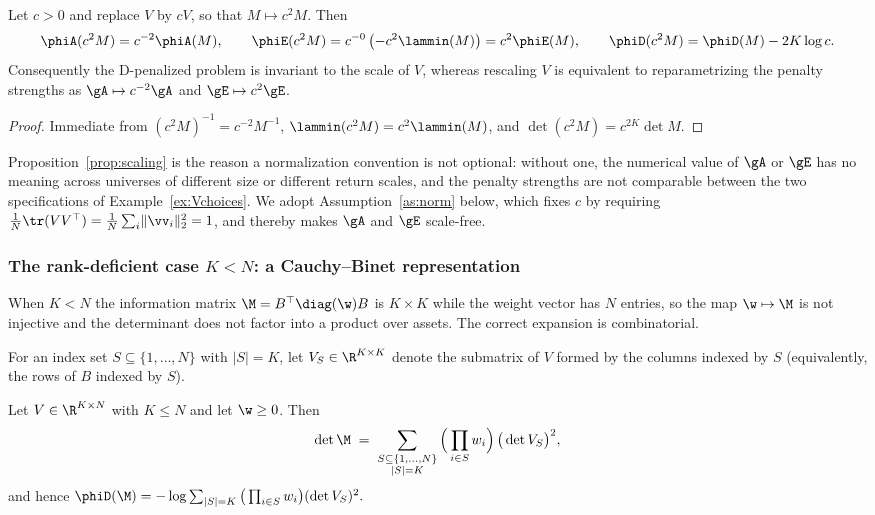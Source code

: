 \begin{proposition}[Scaling]
\label{prop:scaling}
Let $c>0$ and replace $V$ by $cV$, so that $M\mapsto c^{2}M$. Then
\[
  \phiA(c^{2}M)=c^{-2}\phiA(M),\qquad
  \phiE(c^{2}M)=c^{-0}\,\big({-}c^{2}\lammin(M)\big)=c^{2}\phiE(M),\qquad
  \phiD(c^{2}M)=\phiD(M)-2K\log c .
\]
Consequently the D-penalized problem is invariant to the scale of $V$, whereas
rescaling $V$ is equivalent to reparametrizing the penalty strengths as
$\gA\mapsto c^{-2}\gA$ and $\gE\mapsto c^{2}\gE$.
\end{proposition}

\begin{proof}
Immediate from $(c^2M)^{-1}=c^{-2}M^{-1}$, $\lammin(c^2M)=c^2\lammin(M)$, and
$\det(c^2M)=c^{2K}\det M$.
\end{proof}

Proposition~\ref{prop:scaling} is the reason a normalization convention is not
optional: without one, the numerical value of $\gA$ or $\gE$ has no meaning
across universes of different size or different return scales, and the penalty
strengths are not comparable between the two specifications of
Example~\ref{ex:Vchoices}. We adopt Assumption~\ref{as:norm} below, which fixes
$c$ by requiring $\tfrac1N\tr(VV^\top)=\tfrac1N\sum_i\lVert\vv_i\rVert_2^2=1$, and
thereby makes $\gA$ and $\gE$ scale-free.

\subsubsection{The rank-deficient case $K<N$: a Cauchy--Binet representation}

When $K<N$ the information matrix $\M=B^\top\diag(\w)B$ is $K\times K$ while the
weight vector has $N$ entries, so the map $\w\mapsto\M$ is not injective and the
determinant does not factor into a product over assets. The correct expansion is
combinatorial.

For an index set $S\subseteq\{1,\dots,N\}$ with $\lvert S\rvert=K$, let
$V_S\in\R^{K\times K}$ denote the submatrix of $V$ formed by the columns indexed
by $S$ (equivalently, the rows of $B$ indexed by $S$).

\begin{theorem}
\label{thm:cauchybinet}
Let $V\in\R^{K\times N}$ with $K\le N$ and let $\w\ge0$. Then
\begin{equation}
  \det \M \;=\; \sum_{\substack{S\subseteq\{1,\dots,N\}\\ \lvert S\rvert=K}}
  \Big(\prod_{i\in S}w_i\Big)\,\big(\det V_S\big)^{2},
  \label{eq:cb}
\end{equation}
and hence
$\phiD(\M)=-\log\sum_{\lvert S\rvert=K}\big(\prod_{i\in S}w_i\big)(\det V_S)^2 .$
\end{theorem}

